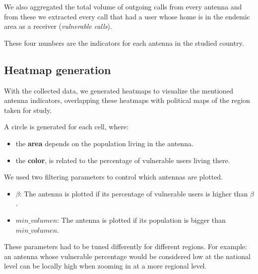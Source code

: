     We also aggregated the total volume of outgoing calls from every antenna and from these we extracted every call that had a user whose home is in the endemic area as a receiver (\textit{vulnerable calls}).
    
    These four numbers are the indicators for each antenna in the studied country.

\subsection{Heatmap generation}
    With the collected data, we generated heatmaps to visualize the mentioned antenna indicators, overlapping these heatmaps with political maps of the region taken for study.
    
	A circle is generated for each cell, where:
	\begin{itemize}
		\item the \textbf{area} depends on the population living in the antenna.
		\item the \textbf{color}, is related to the percentage of vulnerable users living there.
	\end{itemize}
    
    We used two filtering parameters to control which antennas are plotted.
    \begin{itemize}
        \item $\beta$: The antenna is plotted if its percentage of vulnerable users is higher than $\beta$.
        \item $min\_volumen$: The antenna is plotted if its population is bigger than $min\_volumen$.
    \end{itemize}
    
    These parameters had to be tuned differently for different regions. For example: an antenna whose vulnerable percentage would be considered low at the national level can be locally high when zooming in at a more regional level.